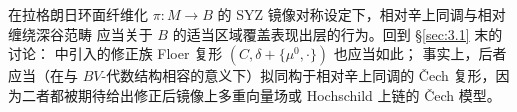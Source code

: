 \documentclass[UTF8,a4paper,11pt,fontset=windows]{ctexart}
\theoremstyle{cnthm}
\numberwithin{equation}{section}
\begin{document}
在拉格朗日环面纤维化 $\pi:M\to B$ 的 SYZ 镜像对称设定下，相对辛上同调与相对缠绕深谷范畴
应当关于 $B$ 的适当区域覆盖表现出层的行为。回到 \S\ref{sec:3.1} 末的讨论：
\cite{r24} 中引入的修正族 Floer 复形 $(C,\delta+\{\mu^{0},\cdot\})$ 也应当如此；
事实上，后者应当（在与 $BV$-代数结构相容的意义下）拟同构于相对辛上同调的
\v{C}ech 复形，因为二者都被期待给出修正后镜像上多重向量场或 Hochschild 上链的
\v{C}ech 模型。


\clearpage
\end{document}
